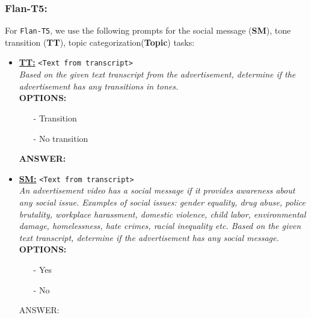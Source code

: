 \subsubsection{Flan-T5:}
For \texttt{Flan-T5}, we use the following prompts for the social message (\textbf{SM}), tone transition (\textbf{TT}), topic categorization(\textbf{Topic}) tasks: 
\begin{itemize}

\item \textbf{\underline{TT:}} 
\texttt{<Text from transcript>} \\
\textit{Based on the given text transcript from the advertisement, determine if the advertisement has any transitions in tones.} \\ 
\textbf{OPTIONS:}
\begin{itemize}
\item[-] Transition
\item[-] No transition
\end{itemize}
\textbf{ANSWER:}

\item \textbf{\underline{SM:}}
\texttt{<Text from transcript>} \\
\textit{An advertisement video has a social message if it provides awareness about any social issue. Examples of social issues: gender equality, drug abuse, police brutality, workplace harassment, domestic violence, child labor, environmental damage, homelessness, hate crimes, racial inequality etc. Based on the given text transcript, determine if the advertisement has any social message.}\\
\textbf{OPTIONS:}
\begin{itemize}
\item[-] Yes
\item[-] No
\end{itemize}
ANSWER: 


\end{itemize}
